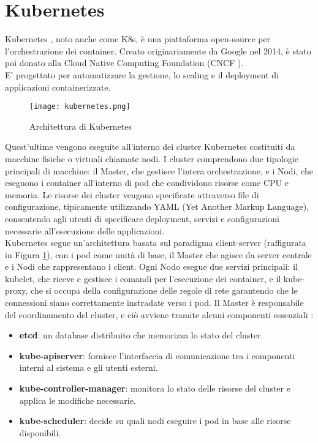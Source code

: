 \section{Kubernetes}
Kubernetes \cite{kubernetes}, noto anche come K8s, è una piattaforma open-source per l'orchestrazione dei container.
Creato originariamente da Google nel 2014, è stato poi donato alla Cloud Native Computing Foundation (CNCF \cite{cncf}).
\\E' progettato per automatizzare la gestione, lo scaling e il deployment di applicazioni containerizzate.
\begin{figure}[h]
    \centering
   \texttt{[image: kubernetes.png]}
    \caption{Architettura di Kubernetes \cite{kubeart}}
    \label{fig:kube}
\end{figure}
Quest'ultime vengono eseguite all'interno dei cluster Kubernetes costituiti da macchine fisiche o virtuali chiamate nodi. 
I cluster comprendono due tipologie principali di macchine: il Master, che gestisce l'intera orchestrazione, e i Nodi, che eseguono i container all'interno di pod che condividono risorse come CPU e memoria.
Le risorse dei cluster vengono specificate attraverso file di configurazione, tipicamente utilizzando YAML (Yet Another Markup Language), consentendo agli utenti di specificare deployment, servizi e configurazioni necessarie all'esecuzione delle applicazioni.
\\Kubernetes segue un'architettura basata sul paradigma client-server (raffigurata in Figura \ref{fig:kube}), con i pod come unità di base, il Master che agisce da server centrale e i Nodi che rappresentano i client. 
Ogni Nodo esegue due servizi principali: il kubelet, che riceve e gestisce i comandi per l'esecuzione dei container, 
e il kube-proxy, che si occupa della configurazione delle regole di rete garantendo che le connessioni siano correttamente instradate verso i pod.
Il Master è responsabile del coordinamento del cluster, e ciò avviene tramite alcuni componenti essenziali \cite{kubeart}:
\begin{itemize}
    \item \textbf{etcd}: un database distribuito che memorizza lo stato del cluster.
    \item \textbf{kube-apiserver}: fornisce l'interfaccia di comunicazione tra i componenti interni al sistema e gli utenti esterni.
    \item \textbf{kube-controller-manager}: monitora lo stato delle risorse del cluster e applica le modifiche necessarie.
    \item \textbf{kube-scheduler}: decide su quali nodi eseguire i pod in base alle risorse disponibili.
\end{itemize}
